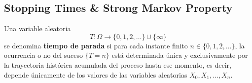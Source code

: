 \subsection{Stopping Times \& Strong Markov Property}

\begin{definicion}
    Una variable aleatoria 
    $$T: \Omega \rightarrow \{0, 1, 2, \dots\} \cup \{\infty\}$$ 
    se denomina \textbf{tiempo de parada} si para cada instante finito $n \in \{0, 1, 2, \dots\}$, la ocurrencia o no del suceso $\{T = n\}$ está determinada única y exclusivamente por la trayectoria histórica acumulada del proceso hasta ese momento, es decir, depende únicamente de los valores de las variables aleatorias $X_0, X_1, \dots, X_n$.
\end{definicion}

